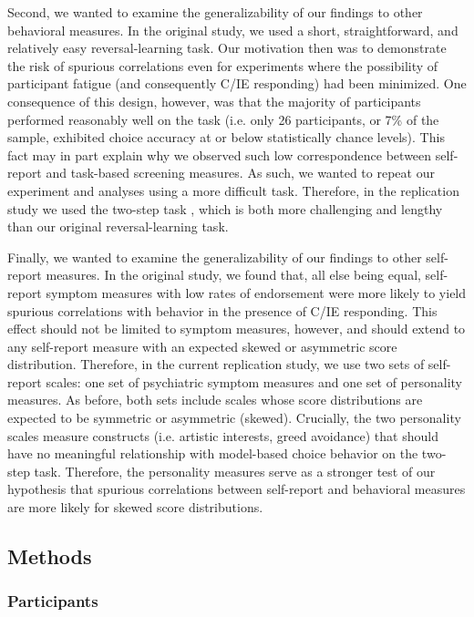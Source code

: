 \documentclass[a4paper,notitlepage,12pt]{article}
\begin{document}
\begin{refsection}[supp]
Second, we wanted to examine the generalizability of our findings to other behavioral measures. In the original study, we used a short, straightforward, and relatively easy reversal-learning task. Our motivation then was to demonstrate the risk of spurious correlations even for experiments where the possibility of participant fatigue (and consequently C/IE responding) had been minimized. One consequence of this design, however, was that the majority of participants performed reasonably well on the task (i.e. only 26 participants, or 7\% of the sample, exhibited choice accuracy at or below statistically chance levels). This fact may in part explain why we observed such low correspondence between self-report and task-based screening measures. As such, we wanted to repeat our experiment and analyses using a more difficult task. Therefore, in the replication study we used the two-step task \cite{daw2011model}, which is both more challenging and lengthy than our original reversal-learning task. 

Finally, we wanted to examine the generalizability of our findings to other self-report measures. In the original study, we found that, all else being equal, self-report symptom measures with low rates of endorsement were more likely to yield spurious correlations with behavior in the presence of C/IE responding. This effect should not be limited to symptom measures, however, and should extend to any self-report measure with an expected skewed or asymmetric score distribution. Therefore, in the current replication study, we use two sets of self-report scales: one set of psychiatric symptom measures and one set of personality measures. As before, both sets include scales whose score distributions are expected to be symmetric or asymmetric (skewed). Crucially, the two personality scales measure constructs (i.e. artistic interests, greed avoidance) that should have no meaningful relationship with model-based choice behavior on the two-step task. Therefore, the personality measures serve as a stronger test of our hypothesis that spurious correlations between self-report and behavioral measures are more likely for skewed score distributions. 

\subsection*{Methods}

\subsubsection*{Participants}


\end{refsection}
\end{document}
